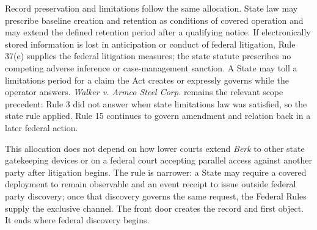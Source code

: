 Record preservation and limitations follow the same allocation. State law may prescribe baseline creation and retention as conditions of covered operation and may extend the defined retention period after a qualifying notice. If electronically stored information is lost in anticipation or conduct of federal litigation, Rule 37(e) supplies the federal litigation measures; the state statute prescribes no competing adverse inference or case-management sanction. A State may toll a limitations period for a claim the Act creates or expressly governs while the operator answers. \emph{Walker v. Armco Steel Corp.} remains the relevant scope precedent: Rule 3 did not answer when state limitations law was satisfied, so the state rule applied. Rule 15 continues to govern amendment and relation back in a later federal action.

This allocation does not depend on how lower courts extend \emph{Berk} to other state gatekeeping devices or on a federal court accepting parallel access against another party after litigation begins. The rule is narrower: a State may require a covered deployment to remain observable and an event receipt to issue outside federal party discovery; once that discovery governs the same request, the Federal Rules supply the exclusive channel. The front door creates the record and first object. It ends where federal discovery begins.
